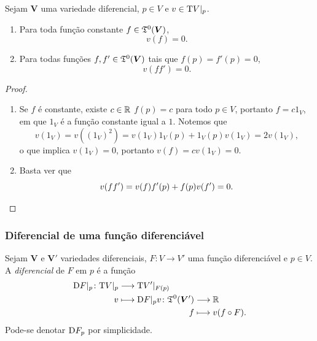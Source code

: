 \begin{proposition}
\label{topo:prop.deriva.lema}
Sejam $\bm V$ uma variedade diferencial, $p \in V$ e $v \in \mathrm{T} V|_p$.
	\begin{enumerate}
	\item Para toda função constante $f \in \mathfrak{T}^0(\bm V)$,
		\begin{equation*}
		v(f) = 0.
		\end{equation*}
	\item Para todas funções $f,f' \in \mathfrak{T}^0(\bm V)$ tais que $f(p)=f'(p)=0$,
		\begin{equation*}
		v(ff')=0.
		\end{equation*}
	\end{enumerate}
\end{proposition}
\begin{proof}
	\begin{enumerate}
	\item Se $f$ é constante, existe $c \in \mathbb{R}$ $f(p)=c$ para todo $p \in V$, portanto $f=c1_V$, em que $1_V$ é a função constante igual a $1$. Notemos que
		\begin{equation*}
		v(1_V) = v((1_V)^2) = v(1_V)1_V(p) + 1_V(p)v(1_V) = 2v(1_V),
		\end{equation*}
o que implica $v(1_V)=0$, portanto $v(f) = cv(1_V) = 0$.
	\item Basta ver que
		\begin{equation*}
		v(ff') = v(f)f'(p) + f(p)v(f') = 0. \qedhere
		\end{equation*}
	\end{enumerate}
\end{proof}

\subsubsection{Diferencial de uma função diferenciável}

\begin{definition}
Sejam $\bm V$ e $\bm V'$ variedades diferenciais, $F\colon V \to V'$ uma função diferenciável e $p \in V$. A \emph{diferencial} de $F$ em $p$ é a função
	\begin{align*}
	\func{\D F|_p}{\Tg V|_p}{\Tg V'|_{F(p)}}{v}{
		\begin{aligned}[t]
		\func{\D F|_p v}{\tens^0(\bm V')}{\R}{f}{v(f \circ F).}
		\end{aligned}
		}
	\end{align*}
Pode-se denotar $\mathrm{D} F_p$ por simplicidade.
\end{definition}


